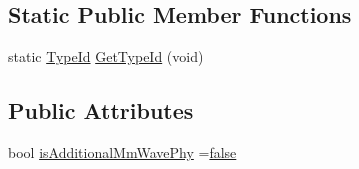 \subsection*{Static Public Member Functions}
\begin{DoxyCompactItemize}
\item 
static \hyperlink{classns3_1_1TypeId}{Type\+Id} \hyperlink{classns3_1_1MmWaveBeamforming_a1e06ea7765fe9a39f1a33c05d02fb5b4}{Get\+Type\+Id} (void)
\end{DoxyCompactItemize}
\subsection*{Public Attributes}
\begin{DoxyCompactItemize}
\item 
bool \hyperlink{classns3_1_1MmWaveBeamforming_ab99a829ca6ca2545cad6551b648484bb}{is\+Additional\+Mm\+Wave\+Phy} =\hyperlink{lte__cqi__generation_8m_ab1bef239d413c4da139c4bac92cd657a}{false}
\end{DoxyCompactItemize}
